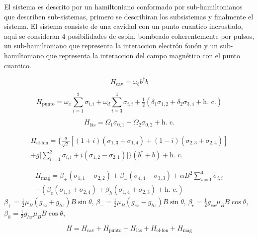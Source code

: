 \documentclass[main.tex]{subfiles}
\begin{document}
El sistema es descrito por un hamiltoniano conformado por sub-hamiltonianos que describen sub-sistemas, primero se describiran los subsistemas y finalmente el sistema. El sistema consiste de una cavidad con un punto cuantico incrustado, aqui se consideran 4 posibilidades de espin, bombeado coherentemente por pulsos, un sub-hamiltoniano que representa la interaccion electr\'on fon\'on y un sub-hamiltoniano que representa la interaccion del campo magn\'etico con el punto cuantico.

\begin{equation}
	H_\text{cav} = \omega_b b^\dagger b
\end{equation}

\begin{equation}
	H_\text{punto} = \omega_x \sum_{i = 1}^{2} \sigma_{i,i} + \omega_d \sum_{i = 3}^{4} \sigma_{i,i} + \tfrac{1}{2} (\delta_1 \sigma_{1, 2} + \delta_2 \sigma_{3, 4} + \text{h. c.})
\end{equation}

\begin{equation}
	H_\text{l\'as} = \Omega_1 \sigma_{0, 1} + \Omega_2 \sigma_{0, 2} + \text{h. c.}
\end{equation}

\begin{multline}
	H_\text{el-fon} = \Big\{\frac{g}{\sqrt{2}} [(1 + i)(\sigma_{1, 3} + \sigma_{1, 4}) + (1 - i)(\sigma_{2, 3} + \sigma_{2, 4})]\\ + g \big[\sum_{i = 1}^{2} \sigma_{i, i} + i (\sigma_{1, 2} - \sigma_{2, 1})\big] \Big\}(b^\dagger + b) + \text{h. c.}
\end{multline}

\begin{multline}
	H_\text{mag} = \beta_+ (\sigma_{1, 1} - \sigma_{2, 2}) + \beta_- (\sigma_{4, 4} - \sigma_{3, 3}) + \alpha B^2 \sum_{i = 1}^{4} \sigma_{i, i}\\ + (\beta_e (\sigma_{1, 3} + \sigma_{2, 4}) + \beta_h (\sigma_{1, 4} + \sigma_{2, 3}) + \text{h. c.})
\end{multline}
$\beta_+ = \tfrac{1}{2} \mu_B (g_{ez} + g_{hz}) B \sin\theta$, $\beta_- = \tfrac{1}{2} \mu_B (g_{ez}-g_{hz}) B \sin\theta$, $\beta_e = \tfrac{1}{2} g_{ex} \mu_B B \cos\theta$,  $\beta_h = \tfrac{1}{2} g_{hx} \mu_B B \cos\theta$, 

\begin{equation}
	H = H_\text{cav} + H_\text{punto} + H_\text{l\'as} + H_\text{el-fon} + H_\text{mag}
\end{equation}
\end{document}
